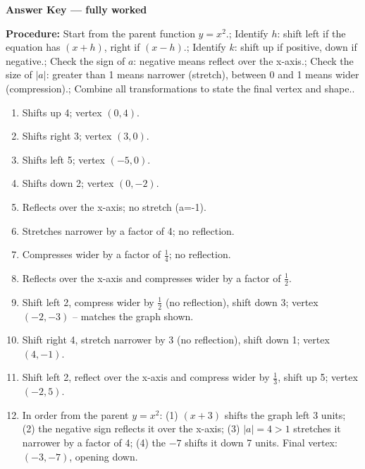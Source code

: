 \documentclass[12pt]{article}
\begin{document}
\begin{center}{\Large \textbf{Answer Key --- fully worked}}\end{center}
\vspace{0.25cm}
\textbf{Procedure:} Start from the parent function $y=x^2$.; Identify $h$: shift left if the equation has $(x+h)$, right if $(x-h)$.; Identify $k$: shift up if positive, down if negative.; Check the sign of $a$: negative means reflect over the x-axis.; Check the size of $|a|$: greater than 1 means narrower (stretch), between 0 and 1 means wider (compression).; Combine all transformations to state the final vertex and shape..\\[8pt]
\begin{enumerate}[label=\textbf{\arabic*.},itemsep=7pt]
  \item Shifts up 4; vertex $(0,4)$.
  \item Shifts right 3; vertex $(3,0)$.
  \item Shifts left 5; vertex $(-5,0)$.
  \item Shifts down 2; vertex $(0,-2)$.
  \item Reflects over the x-axis; no stretch (a=-1).
  \item Stretches narrower by a factor of 4; no reflection.
  \item Compresses wider by a factor of $\frac{1}{4}$; no reflection.
  \item Reflects over the x-axis and compresses wider by a factor of $\frac{1}{2}$.
  \item Shift left 2, compress wider by $\frac{1}{2}$ (no reflection), shift down 3; vertex $(-2,-3)$ -- matches the graph shown.
  \item Shift right 4, stretch narrower by 3 (no reflection), shift down 1; vertex $(4,-1)$.
  \item Shift left 2, reflect over the x-axis and compress wider by $\frac{1}{3}$, shift up 5; vertex $(-2,5)$.
  \item In order from the parent $y=x^2$: (1) $(x+3)$ shifts the graph left 3 units; (2) the negative sign reflects it over the x-axis; (3) $|a|=4>1$ stretches it narrower by a factor of 4; (4) the $-7$ shifts it down 7 units. Final vertex: $(-3,-7)$, opening down.
\end{enumerate}
\end{document}
